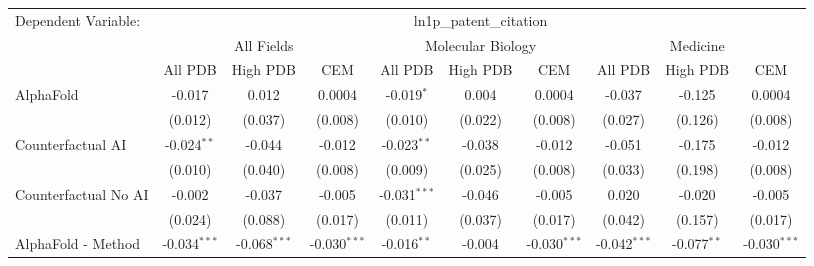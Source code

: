 \begingroup
\centering
\begin{tabular}{lccccccccc}
   \tabularnewline \midrule \midrule
   Dependent Variable: & \multicolumn{9}{c}{ln1p\_patent\_citation}\\
 & \multicolumn{3}{c}{All Fields} & \multicolumn{3}{c}{Molecular Biology} & \multicolumn{3}{c}{Medicine} \\
\cmidrule(lr){2-7} \cmidrule(lr){5-10} \cmidrule(lr){8-7}
 & \multicolumn{1}{c}{All PDB} & \multicolumn{1}{c}{High PDB} & \multicolumn{1}{c}{CEM} & \multicolumn{1}{c}{All PDB} & \multicolumn{1}{c}{High PDB} & \multicolumn{1}{c}{CEM} & \multicolumn{1}{c}{All PDB} & \multicolumn{1}{c}{High PDB} & \multicolumn{1}{c}{CEM} \\
\cmidrule(lr){2-3} \cmidrule(lr){3-4} \cmidrule(lr){4-5} \cmidrule(lr){5-6} \cmidrule(lr){6-7} \cmidrule(lr){7-8} \cmidrule(lr){8-9} \cmidrule(lr){9-10} \cmidrule(lr){10-3}
   AlphaFold                                                   & -0.017         & 0.012          & 0.0004         & -0.019$^{*}$   & 0.004         & 0.0004         & -0.037         & -0.125         & 0.0004\\   
                                                               & (0.012)        & (0.037)        & (0.008)        & (0.010)        & (0.022)       & (0.008)        & (0.027)        & (0.126)        & (0.008)\\   
   Counterfactual AI                                           & -0.024$^{**}$  & -0.044         & -0.012         & -0.023$^{**}$  & -0.038        & -0.012         & -0.051         & -0.175         & -0.012\\   
                                                               & (0.010)        & (0.040)        & (0.008)        & (0.009)        & (0.025)       & (0.008)        & (0.033)        & (0.198)        & (0.008)\\   
   Counterfactual No AI                                        & -0.002         & -0.037         & -0.005         & -0.031$^{***}$ & -0.046        & -0.005         & 0.020          & -0.020         & -0.005\\   
                                                               & (0.024)        & (0.088)        & (0.017)        & (0.011)        & (0.037)       & (0.017)        & (0.042)        & (0.157)        & (0.017)\\   
   AlphaFold - Method                                          & -0.034$^{***}$ & -0.068$^{***}$ & -0.030$^{***}$ & -0.016$^{**}$  & -0.004        & -0.030$^{***}$ & -0.042$^{***}$ & -0.077$^{**}$  & -0.030$^{***}$\\   

\end{tabular}

